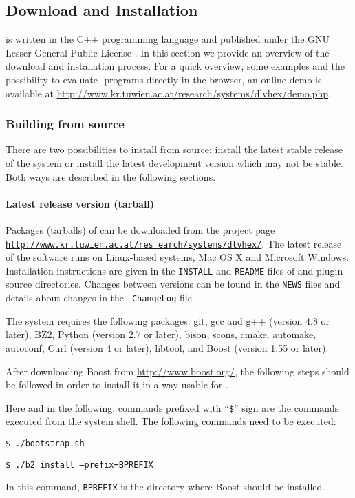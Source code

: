 \documentclass[a4paper, titlepage]{article}
\newcommand\leftaligned[1]{\par \smallskip #1 \smallskip \par}
\begin{document}
\subsection{Download and Installation}
\dlvhex{} is written in the C++ programming language
and published under the GNU Lesser General 
Public License \cite{licnc}. 
In this section we provide an overview of the 
download and installation process. For a quick overview, 
some examples and the possibility to evaluate 
\hex{}-programs directly in the browser,
an online demo is available at
\url{http://www.kr.tuwien.ac.at/research/systems/dlvhex/demo.php}.

\subsubsection{Building from source}
There are two possibilities to install \dlvhex{} 
from source: install the latest stable release of the 
system or install the latest development version which may 
not be stable. Both ways are described in the following 
sections.  

\paragraph{Latest release version (tarball)}
\label{sec:steps}
Packages (tarballs) of \dlvhex{} can be downloaded from the 
project page
\href{http://www.kr.tuwien.ac.at/research/systems/dlvhex/}%
{\tt http://www.kr.tuwien.ac.at/res earch/systems/dlvhex/}.
The latest release of the 
software runs on Linux-based systems, Mac OS X and 
Microsoft Windows. Installation instructions are given in 
the {\tt INSTALL} and {\tt README} files of \dlvhex{} 
and plugin source directories. Changes between versions can 
be found in the {\tt NEWS} files and details about changes in the {\tt 
ChangeLog} file. 

The system requires the following packages:
git, gcc and g++ (version 4.8 or later),
BZ2, Python (version 2.7 or later), bison, scons, 
cmake, automake, autoconf,
Curl (version 4 or later),
libtool, and Boost (version 1.55 or later). 

After downloading Boost from
\url{http://www.boost.org/},
the following steps should be followed in order 
to install it in a way usable for \dlvhex.

Here and in the following, commands prefixed with ``\texttt{\$}'' sign are the commands executed from the system shell.
The following commands need to be executed:
%
\leftaligned{\texttt{\$ \thinspace ./bootstrap.sh}}
%
\leftaligned{\texttt{\$ \thinspace ./b2 install --prefix=BPREFIX}}
%
In this 
command, \texttt{BPREFIX} is the directory where Boost should 
be installed. 
\end{document}
